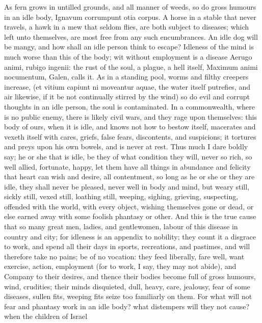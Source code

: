 {{As fern grows in untilled grounds, and all manner of weeds, so do gross
humours in an idle body, Ignavum corrumpunt otia corpus. A horse in a
stable that never travels, a hawk in a mew that seldom flies, are both
subject to diseases; which left unto themselves, are most free from any
such encumbrances. An idle dog will be mangy, and how shall an idle
person think to escape? Idleness of the mind is much worse than this of
the body; wit without employment is a disease Aerugo animi,
rubigo ingenii: the rust of the soul, a plague, a hell itself,
Maximum animi nocumentum, Galen, calls it. As in a standing pool,
worms and filthy creepers increase, (et vitium capiunt ni moveantur
aquae, the water itself putrefies, and air likewise, if it be not
continually stirred by the wind) so do evil and corrupt thoughts in an
idle person, the soul is contaminated. In a commonwealth, where is no
public enemy, there is likely civil wars, and they rage upon
themselves: this body of ours, when it is idle, and knows not how to
bestow itself, macerates and vexeth itself with cares, griefs, false
fears, discontents, and suspicions; it tortures and preys upon his own
bowels, and is never at rest. Thus much I dare boldly say; he or she
that is idle, be they of what condition they will, never so rich, so
well allied, fortunate, happy, let them have all things in abundance
and felicity that heart can wish and desire, all contentment, so long
as he or she or they are idle, they shall never be pleased, never well
in body and mind, but weary still, sickly still, vexed still, loathing
still, weeping, sighing, grieving, suspecting, offended with the world,
with every object, wishing themselves gone or dead, or else earned away
with some foolish phantasy or other. And this is the true cause that so
many great men, ladies, and gentlewomen, labour of this disease in
country and city; for idleness is an appendix to nobility; they count
it a disgrace to work, and spend all their days in sports, recreations,
and pastimes, and will therefore take no pains; be of no vocation: they
feed liberally, fare well, want exercise, action, employment (for to
work, I say, they may not abide), and Company to their desires, and
thence their bodies become full of gross humours, wind, crudities;
their minds disquieted, dull, heavy, \etc{} care, jealousy, fear of some
diseases, sullen fits, weeping fits seize too familiarly on them.
For what will not fear and phantasy work in an idle body? what
distempers will they not cause? when the children of  Israel
}}

